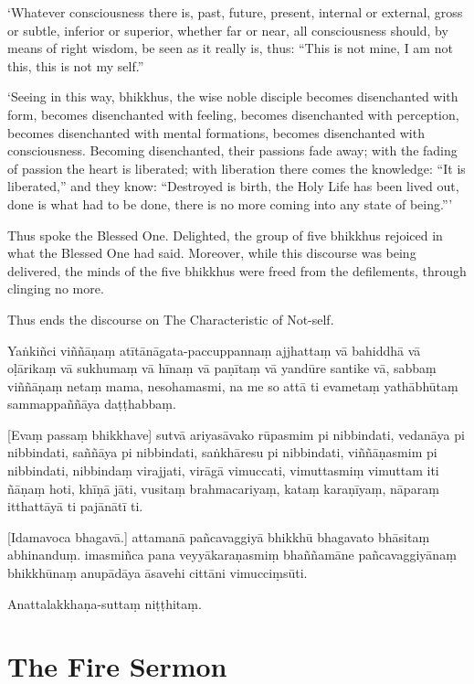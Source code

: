\clearpage

\englishText
\markboth{\englishTitle}{\rightmark}

‘Whatever consciousness there is, past, future, present, internal or
external, gross or subtle, inferior or superior, whether far or near,
all consciousness should, by means of right wisdom, be seen as it really
is, thus: “This is not mine, I am not this, this is not my self.”

‘Seeing in this way, bhikkhus, the wise noble disciple becomes
disenchanted with form, becomes disenchanted with feeling, becomes
disenchanted with perception, becomes disenchanted with mental
formations, becomes disenchanted with consciousness. Becoming
disenchanted, their passions fade away; with the fading of passion the
heart is liberated; with liberation there comes the knowledge: “It is
liberated,” and they know: “Destroyed is birth, the Holy Life has been
lived out, done is what had to be done, there is no more coming into any
state of being.”\thinspace ’

Thus spoke the Blessed One. Delighted, the group of five bhikkhus
rejoiced in what the Blessed One had said. Moreover, while this discourse was
being delivered, the minds of the five bhikkhus were freed from the
defilements, through clinging no more.

Thus ends the discourse on The Characteristic of Not-self.

\clearpage

\paliText
\markboth{\paliTitle}{\rightmark}

Yaṅkiñci viññāṇaṃ atītānāgata-paccuppannaṃ ajjhattaṃ vā bahiddhā vā
oḷārikaṃ vā sukhumaṃ vā hīnaṃ vā paṇītaṃ vā yandūre santike vā, sabbaṃ
viññāṇaṃ netaṃ mama, nesohamasmi, na me so attā ti evametaṃ yathābhūtaṃ
sammappaññāya daṭṭhabbaṃ.

[Evaṃ passaṃ bhikkhave] sutvā ariyasāvako rūpasmim pi nibbindati, vedanāya
pi nibbindati, saññāya pi nibbindati, saṅkhāresu pi nibbindati,
viññāṇasmim pi nibbindati, nibbindaṃ virajjati, virāgā vimuccati,
vimuttasmiṃ vimuttam iti ñāṇaṃ hoti, khīṇā jāti, vusitaṃ brahmacariyaṃ,
kataṃ karaṇīyaṃ, nāparaṃ itthattāyā ti pajānātī ti.

[Idamavoca bhagavā.] attamanā pañcavaggiyā bhikkhū bhagavato bhāsitaṃ
abhinanduṃ. imasmiñca pana veyyākaraṇasmiṃ bhaññamāne pañcavaggiyānaṃ
bhikkhūnaṃ anupādāya āsavehi cittāni vimucciṃsūti.

Anattalakkhaṇa-suttaṃ niṭṭhitaṃ.

\chapterTocDelegatePageNumber
\chapter{The Fire Sermon}%


